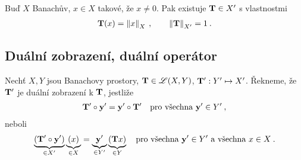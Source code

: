 \begin{theorem}
Buď $X$ Banachův, $x \in X$ takové, že $x \neq 0$. Pak existuje $\mathbf{T} \in X'$ s vlastnostmi \begin{align*}
    \mathbf{T}(x) = \left\lVert x\right\rVert_X \:, \qquad \left\lVert\mathbf{T}\right\rVert_{X'} = 1 \:.
\end{align*}
\end{theorem}

\subsection{Duální zobrazení, duální operátor}

\begin{definition}
Nechť $X,Y$ jsou Banachovy prostory, $\mathbf{T} \in \mathscr{L} (X,Y)$, $\mathbf{T}' : Y' \mapsto X'$. Řekneme, že $\mathbf{T}'$ je duální zobrazení k $\mathbf{T}$, jestliže \begin{align*}
    \mathbf{T}' \circ \mathbf{y}' = \mathbf{y}' \circ \mathbf{T}' \quad \text{pro všechna } \mathbf{y}' \in Y' \:,
\end{align*}
neboli \begin{align*}
    \underbrace{(\mathbf{T}' \circ \mathbf{y}')}_{\in X'} \underbrace{(x)}_{\in X} = \underbrace{\mathbf{y}'}_{\in Y'} \underbrace{(\mathbf{T} x)}_{\in Y} \quad \text{pro všechna } \mathbf{y}' \in Y' \text{ a všechna } x \in X \:.
\end{align*}
\end{definition}

